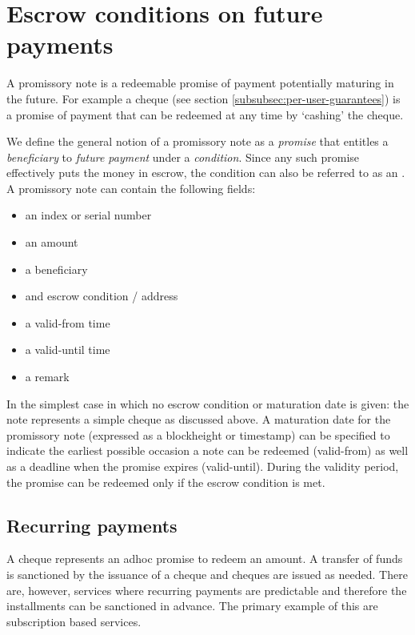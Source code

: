 \section{Escrow conditions on future payments}

A promissory note is a redeemable promise of payment potentially maturing in the future. For example a cheque (see section \ref{subsubsec:per-user-guarantees}) is a promise of payment that can be redeemed at any time by `cashing' the cheque. 

We define the general notion of a promissory note as a \emph{promise} that entitles a \emph{beneficiary} to \emph{future payment} under a \emph{condition}. Since any such promise effectively puts the money in escrow, the condition can also be referred to as an  . A promissory note can contain the following fields:

  \begin{itemize}
    \item an index or serial number
    \item an amount
    \item a beneficiary
    \item and escrow condition / address
    \item a valid-from time
    \item a valid-until time
    \item a remark
  \end{itemize}

In the simplest case in which no escrow condition or maturation date is given: the note represents a simple cheque as discussed above.
A maturation date for the promissory note (expressed as a blockheight or timestamp) can be specified to indicate the earliest possible occasion a note can be redeemed (valid-from) as well as a deadline when the promise expires (valid-until).
During the validity period, the promise can be redeemed only if the escrow condition is met.


\subsection{Recurring payments}

A cheque represents an adhoc promise to redeem an amount. A transfer of funds is sanctioned by the issuance of a cheque and cheques are issued as needed. There are, however, services where recurring payments are predictable and therefore the installments can be sanctioned in advance. The primary example of this are subscription based services. 

